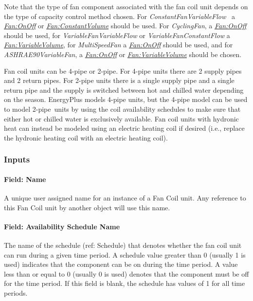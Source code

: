 Note that the type of fan component associated with the fan coil unit depends on the type of capacity control method chosen. For \emph{ConstantFanVariableFlow~} a \emph{\hyperref[fanonoff]{Fan:OnOff}} or \emph{\hyperref[fanconstantvolume]{Fan:ConstantVolume}} should be used. For \emph{CyclingFan}, a \emph{\hyperref[fanonoff]{Fan:OnOff}} should be used, for \emph{VariableFanVariableFlow} or \emph{VariableFanConstantFlow} a \emph{\hyperref[fanvariablevolume]{Fan:VariableVolume}}, for \emph{MultiSpeedFan} a \emph{\hyperref[fanonoff]{Fan:OnOff}} should be used, and for \emph{ASHRAE90VariableFan}, a \emph{\hyperref[fanonoff]{Fan:OnOff}} or \emph{\hyperref[fanvariablevolume]{Fan:VariableVolume}} should be chosen.

Fan coil units can be 4-pipe or 2-pipe. For 4-pipe units there are 2 supply pipes and 2 return pipes. For 2-pipe units there is a single supply pipe and a single return pipe and the supply is switched between hot and chilled water depending on the season. EnergyPlus models 4-pipe units, but the 4-pipe model can be used to model 2-pipe~units by using the coil availability schedules to make sure that either hot or chilled water is exclusively available. Fan coil units with hydronic heat can instead be modeled using an electric heating coil if desired (i.e., replace the hydronic heating coil with an electric heating coil).

\subsubsection{Inputs}\label{inputs-1-053}

\paragraph{Field: Name}\label{field-name-1-051}

A unique user assigned name for an instance of a Fan Coil unit. Any reference to this Fan Coil unit by another object will use this name.

\paragraph{Field: Availability Schedule Name}\label{field-availability-schedule-name-1-015}

The name of the schedule (ref: Schedule) that denotes whether the fan coil unit can run during a given time period. A schedule value greater than 0 (usually 1 is used) indicates that the component can be on during the time period. A value less than or equal to 0 (usually 0 is used) denotes that the component must be off for the time period. If this field is blank, the schedule has values of 1 for all time periods.

